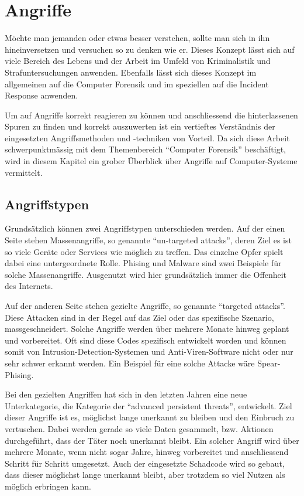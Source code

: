 \chapter{Angriffe} \label{chap:Attacks}

Möchte man jemanden oder etwas besser verstehen, sollte man sich in ihn hineinversetzen und versuchen so zu denken wie er. Dieses Konzept lässt sich auf viele Bereich des Lebens und der Arbeit im Umfeld von Kriminalistik und Strafuntersuchungen anwenden. Ebenfalls lässt sich dieses Konzept im allgemeinen auf die Computer Forensik und im speziellen auf die Incident Response anwenden.

Um auf Angriffe korrekt reagieren zu können und anschliessend die hinterlassenen Spuren zu finden und korrekt auszuwerten ist ein vertieftes Verständnis der eingesetzten Angriffsmethoden und -techniken von Vorteil. Da sich diese Arbeit schwerpunktmässig mit dem Themenbereich "`Computer Forensik"' beschäftigt, wird in diesem Kapitel ein grober Überblick über Angriffe auf Computer-Systeme vermittelt.

\section{Angriffstypen}
Grundsätzlich können zwei Angriffstypen unterschieden werden. Auf der einen Seite stehen Massenangriffe, so genannte "`un-targeted attacks"', deren Ziel es ist so viele Geräte oder Services wie möglich zu treffen. Das einzelne Opfer spielt dabei eine untergeordnete Rolle. Phising und Malware sind zwei Beispiele für solche Massenangriffe. Ausgenutzt wird hier grundsätzlich immer die Offenheit des Internets.

Auf der anderen Seite stehen gezielte Angriffe, so genannte "`targeted attacks"'. Diese Attacken sind in der Regel auf das Ziel oder das spezifische Szenario, massgeschneidert. Solche Angriffe werden über mehrere Monate hinweg geplant und vorbereitet. Oft sind diese Codes spezifisch entwickelt worden und können somit von Intrusion-Detection-Systemen und Anti-Viren-Software nicht oder nur sehr schwer erkannt werden. Ein Beispiel für eine solche Attacke wäre Spear-Phising. \footnotemark


Bei den gezielten Angriffen hat sich in den letzten Jahren eine neue Unterkategorie, die Kategorie der "`advanced persistent threats"', entwickelt. Ziel dieser Angriffe ist es, möglichst lange unerkannt zu bleiben und den Einbruch zu vertuschen. Dabei werden gerade so viele Daten gesammelt, bzw. Aktionen durchgeführt, dass der Täter noch unerkannt bleibt. Ein solcher Angriff wird über mehrere Monate, wenn nicht sogar Jahre, hinweg vorbereitet und anschliessend Schritt für Schritt umgesetzt. Auch der eingesetzte Schadcode wird so gebaut, dass dieser möglichst lange unerkannt bleibt, aber trotzdem so viel Nutzen als möglich erbringen kann.


